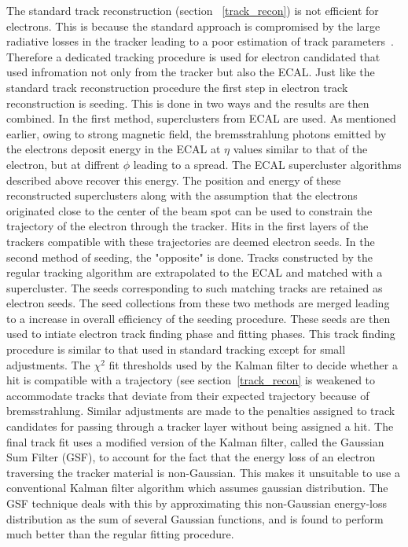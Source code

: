 The standard track reconstruction (section ~\ref{track_recon}) is not efficient for electrons. This is because the standard approach is compromised by the large radiative losses in the tracker leading to a poor estimation of track parameters~\cite{track_reconstruction}. Therefore a dedicated tracking procedure is used for  electron candidated that used infromation not only from the tracker but also the ECAL. Just like the standard track reconstruction procedure the first step in electron track reconstruction is seeding. This is done in two ways and the results are then combined. In the first method, superclusters from ECAL are used. As mentioned earlier, owing to strong magnetic field, the bremsstrahlung photons emitted by the electrons deposit energy in the ECAL at $\eta$ values similar to that of the electron, but at diffrent $\phi$ leading to a spread. The ECAL supercluster algorithms described above recover this energy. The position and  energy of these reconstructed superclusters along with the assumption that the electrons originated close to the center of the beam spot can be used to constrain the trajectory of the electron through the tracker. Hits in the first layers of the trackers compatible with these trajectories are deemed electron seeds. In the second method of seeding, the "opposite" is done. Tracks constructed by the regular tracking algorithm are extrapolated to the ECAL and matched with a supercluster. The seeds corresponding to such matching tracks are retained as electron seeds. The seed collections from these two methods are merged leading to a increase in overall efficiency of the seeding procedure. These seeds are then used to intiate electron track finding phase and fitting phases. This track finding procedure is similar to that used in standard tracking except for small adjustments. The $\chi^2$ fit thresholds used by the Kalman filter to decide whether a hit is compatible with a trajectory (see section~\ref{track_recon} is weakened to accommodate tracks that deviate from their expected trajectory because of bremsstrahlung. Similar adjustments are made to the penalties assigned to track candidates for passing through a tracker layer without being assigned a hit. The final track fit uses a modified version of the Kalman filter, called the Gaussian Sum Filter (GSF), to account for the fact that the energy loss of an electron traversing the tracker material is non-Gaussian. This  makes it unsuitable to use a conventional Kalman filter algorithm which assumes gaussian distribution. The GSF technique deals with this by approximating this non-Gaussian energy-loss distribution as the sum of several Gaussian functions, and is found to perform much better than the regular fitting procedure.

